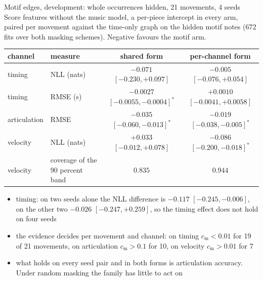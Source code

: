 \documentclass[aspectratio=169,11pt]{beamer}
\begin{document}
\begin{frame}{Motif edges, development: whole occurrences hidden, 21 movements, 4 seeds}
  \footnotesize
  Score features without the music model, a per-piece intercept in every
  arm, paired per movement against the time-only graph on the hidden
  motif notes (672 fits over both masking schemes). Negative favours the
  motif arm.
  \vspace{-1mm}
  \begin{center}
  \scriptsize
  \setlength{\tabcolsep}{4pt}
  \begin{tabular}{@{}llcc@{}}
    \toprule
    channel & measure & shared form & per-channel form \\
    \midrule
    timing & NLL (nats) & $-0.071$ $[-0.230,+0.097]$ & $-0.005$ $[-0.076,+0.054]$ \\
    timing & RMSE (s) & $-0.0027$ $[-0.0055,-0.0004]^{*}$ & $+0.0010$ $[-0.0041,+0.0058]$ \\
    articulation & RMSE & $-0.035$ $[-0.060,-0.013]^{*}$ & $-0.019$ $[-0.038,-0.005]^{*}$ \\
    velocity & NLL (nats) & $+0.033$ $[-0.012,+0.078]$ & $-0.086$ $[-0.200,-0.018]^{*}$ \\
    velocity & coverage of the 90 percent band & $0.835$ & $0.944$ \\
    \bottomrule
  \end{tabular}
  \end{center}
  \vspace{-1mm}
  \begin{itemize}
    \item timing: on two seeds alone the NLL difference is $-0.117$
          $[-0.245,-0.006]$, on the other two $-0.026$ $[-0.247,+0.259]$,
          so the timing effect does not hold on four seeds
    \item the evidence decides per movement and channel: on timing
          $c_{\text{m}} < 0.01$ for 19 of 21 movements, on articulation
          $c_{\text{m}} > 0.1$ for 10, on velocity $c_{\text{m}} > 0.01$ for 7
    \item what holds on every seed pair and in both forms is
          articulation accuracy. Under random masking the family has
          little to act on
  \end{itemize}
\end{frame}
\end{document}
